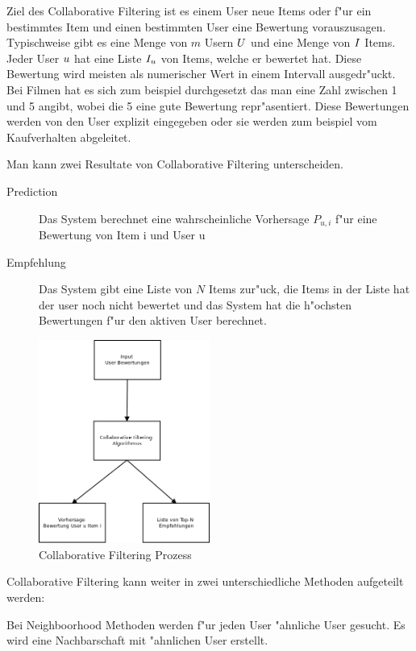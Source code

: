 \documentclass[a4paper, 12pt]{article}
\begin{document}
Ziel des Collaborative Filtering ist es einem User neue Items oder f"ur ein bestimmtes Item und einen bestimmten User eine Bewertung vorauszusagen. Typischweise gibt es eine Menge von $m$ Usern  $\mathnormal{U}$ und eine Menge von $ \mathnormal{I} $ Items. Jeder User $\mathnormal{u}$ hat eine Liste $\mathnormal{I_u}$ von Items, welche er bewertet hat. Diese Bewertung wird meisten als numerischer Wert in einem Intervall ausgedr"uckt. Bei Filmen hat es sich zum beispiel durchgesetzt das man eine Zahl zwischen 1 und 5 angibt, wobei die 5 eine gute Bewertung repr"asentiert. Diese Bewertungen werden von den User explizit eingegeben oder sie werden zum beispiel vom Kaufverhalten abgeleitet.

Man kann zwei Resultate von Collaborative Filtering unterscheiden.

\begin{description}
\item[Prediction] Das System berechnet eine wahrscheinliche Vorhersage $P_{u,i}$ f"ur eine Bewertung von Item i und User u
\item[Empfehlung] Das System gibt eine Liste von $N$ Items zur"uck, die Items in der Liste hat der user noch nicht bewertet und das System hat die h"ochsten Bewertungen f"ur den aktiven User berechnet.
\end{description}

\begin{figure}
  \centering
      \includegraphics[width=0.5\textwidth]{cf}
  \caption{Collaborative Filtering Prozess}
\end{figure}

Collaborative Filtering kann weiter in zwei unterschiedliche Methoden aufgeteilt werden:

Bei Neighboorhood Methoden werden f"ur jeden User "ahnliche User gesucht. Es wird eine Nachbarschaft mit "ahnlichen User erstellt.
\end{document}
